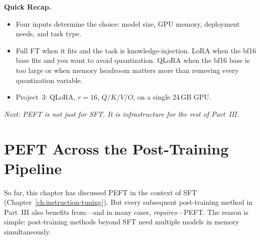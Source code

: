 \noindent{}

\begin{quickrecap}
\textbf{Quick Recap.}
\begin{itemize}[nosep,leftmargin=1.5em]
  \item Four inputs determine the choice: model size, GPU memory, deployment needs, and task type.
  \item Full FT when it fits and the task is knowledge-injection. LoRA when the bf16 base fits and you want to avoid quantization. QLoRA when the bf16 base is too large or when memory headroom matters more than removing every quantization variable.
  \item Project~3: QLoRA, $r = 16$, $Q/K/V/O$, on a single 24\,GB GPU.
\end{itemize}
\textit{Next: PEFT is not just for SFT. It is infrastructure for the rest of Part~III.}
\end{quickrecap}


\section{PEFT Across the Post-Training Pipeline}
\label{sec:peft-pipeline}

So far, this chapter has discussed PEFT in the context of SFT (Chapter~\ref{ch:instruction-tuning}). But every subsequent post-training method in Part~III also benefits from---and in many cases, \emph{requires}---PEFT. The reason is simple: post-training methods beyond SFT need multiple models in memory simultaneously.

